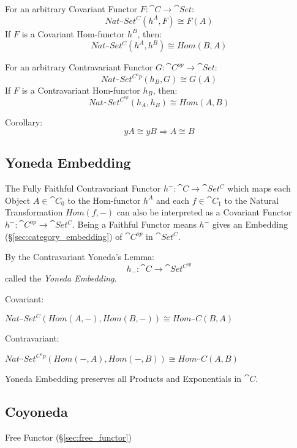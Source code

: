 For an arbitrary Covariant Functor $F : \cat{C} \rightarrow
\cat{Set}$:
\[
  Nat_\cat{Set^C}(h^A,F) \cong F(A)
\]
If $F$ is a Covariant Hom-functor $h^B$, then:
\[
  Nat_\cat{Set^C}(h^A,h^B) \cong Hom(B,A)
\]

For an arbitrary Contravariant Functor $G : \cat{C}^{op} \rightarrow
\cat{Set}$:
\[
  Nat_\cat{Set^{C^op}}(h_B,G) \cong G(A)
\]
If $F$ is a Contravariant Hom-functor $h_B$, then:
\[
  Nat_\cat{Set^{C^{op}}}(h_A,h_B) \cong Hom(A,B)
\]

Corollary:
\[
  yA \cong yB \Rightarrow A \cong B
\]



\subsection{Yoneda Embedding}\label{sec:yoneda_embedding}

The Fully Faithful Contravariant Functor $h^- : \cat{C} \rightarrow
\cat{Set^C}$ which maps each Object $A \in \cat{C}_0$ to the
Hom-functor $h^A$ and each $f \in \cat{C}_1$ to the Natural
Transformation $Hom(f,-)$ can also be interpreted as a Covariant
Functor $h^- : \cat{C^{op}} \rightarrow \cat{Set^C}$. Being a
Faithful Functor means $h^-$ gives an Embedding
(\S\ref{sec:category_embedding}) of $\cat{C^{op}}$ in
$\cat{Set^C}$.

By the Contravariant Yoneda's Lemma:
\[
  h_-: \cat{C} \rightarrow \cat{Set^{C^{op}}}
\]
called the \emph{Yoneda Embedding}.

Covariant:

$Nat_\cat{Set^C}(Hom(A,-), Hom(B,-)) \cong Hom_\cat{C}(B,A)$

Contravariant:

$Nat_\cat{Set^{C^op}}(Hom(-,A), Hom(-,B)) \cong Hom_\cat{C}(A,B)$

Yoneda Embedding preserves all Products and Exponentials in
$\cat{C}$.



\subsection{Coyoneda}\label{sec:coyoneda}

Free Functor (\S\ref{sec:free_functor})



